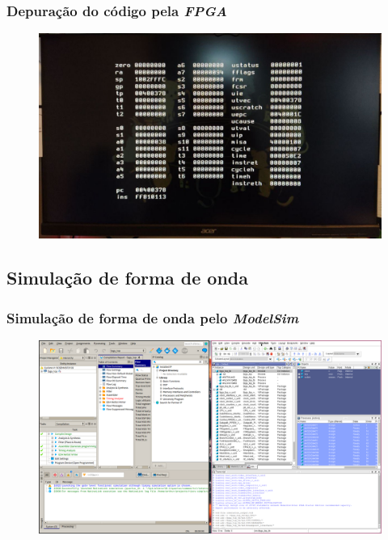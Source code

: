 \documentclass[aspectratio=169]{beamer}
\begin{document}
    \begin{frame}
        \frametitle{Depuração do código pela \textit{FPGA}}
        \vfill
        \begin{figure}[H]
        \centering
            \includegraphics[width=.9\textwidth,height=.85\textheight,keepaspectratio]{../images/osd/display_osd.jpg}
        \end{figure}
        \vfill
    \end{frame}

    \subsection{Simulação de forma de onda}
    \begin{frame}
        \frametitle{Simulação de forma de onda pelo \textit{ModelSim}}
        \vfill
        \begin{figure}[H]
        \centering
            \includegraphics[width=.9\textwidth,height=.85\textheight,keepaspectratio]{../images/quartus/quartus_modelsim.png}
        \end{figure}
        \vfill
    \end{frame}
\end{document}
